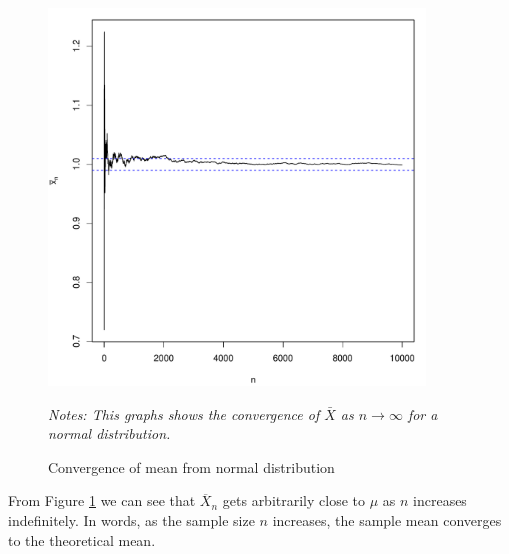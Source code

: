 \begin{example}
\begin{knitrout}
\begin{kframe}
\begin{alltt}
 \hlkwb{<-} \hlstd{(}   \hlstd{=} \hlstd{,}  \hlstd{=} \hlstd{)} 
 \hlkwb{<-}  \hlopt{/}                  
  \hlstd{=} \hlstd{,}  \hlstd{=} \hlstd{(}
\hlstd{(} \hlstd{=} \hlstd{,}  \hlstd{=} \hlstd{,}  \hlstd{=} \hlstd{)}
\hlstd{(} \hlstd{=} \hlstd{,}  \hlstd{=} \hlstd{,}  \hlstd{=} \hlstd{)}
\end{alltt}
\end{kframe}
\end{knitrout}


\begin{figure}[H]
  \caption{Convergence of mean from normal distribution}
    \label{fig:CLTnormal}
        \centering
    \begin{minipage}{.9\linewidth}
\begin{knitrout}
\color{fgcolor}

{\centering \includegraphics[width=10cm,height=10cm]{figure/CLT-normalplot-1} 

}


\end{knitrout}
\footnotesize
		\emph{Notes: This graphs shows the convergence of $\bar{X}$ as $n\to\infty$ for a normal distribution.}
	\end{minipage}
\end{figure}

From Figure \ref{fig:CLTnormal} we can see that $\overline{X}_n$ gets arbitrarily close to $\mu$ as $n$ increases indefinitely. In words, as the sample size $n$ increases, the sample mean converges to the theoretical mean. 
\end{example}

